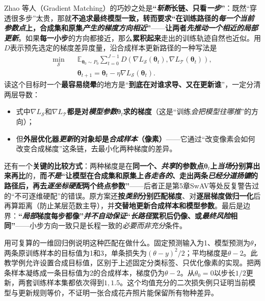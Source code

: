 Zhao 等人（Gradient Matching）的巧妙之处是\textbf{“\emph{斩断}长链、只看\emph{一步}”}：既然“穿透很多步”太贵，那就\textbf{不追求最终模型一致，转而要求“在训练路径的\emph{每一个当前参数点}上，合成集和原集\emph{产生的\emph{梯度方向}相近}”}——\textbf{让两者\emph{先推动一个\emph{相近的局部更新}}}。如果\textbf{每一小步}的方向都接近，那么\textbf{累积起来}走出的训练轨迹自然也近似。用$D$表示预先选定的梯度差异度量，沿合成样本更新路径的一种写法是
\begin{equation}
  \begin{aligned}
    \min_{\mathcal S}\quad&
    \mathbb E_{\bm\theta_0\sim P_0}
    \sum_{t=0}^{J-1}
    D\!\left(\nabla L_{\mathcal S}(\bm\theta_t),
             \nabla L_{\mathcal T}(\bm\theta_t)\right),\\
    &\bm\theta_{t+1}
    =\bm\theta_t-\eta\nabla L_{\mathcal S}(\bm\theta_t).
  \end{aligned}
  \label{eq:ka-condensation-gradient-matching}
\end{equation}
读这个目标时一个\textbf{最容易绕晕}的地方是“\textbf{到底在对谁求导、又在更新谁}”，一定分清两层导数：
\begin{itemize}\item 式中$\nabla L_{\mathcal{S}}$和$\nabla L_{\mathcal{T}}$\textbf{都是对\emph{模型参数}$\bm{\theta}_t$求的梯度}（这是“训练\emph{会把模型往哪推}”的方向）；\item 但\textbf{外层优化器\emph{更新}的对象却是\emph{合成样本}（像素）}——它通过“改变像素会如何改变合成梯度”这条链，去最小化两种梯度的差异。\end{itemize}
还有一个\textbf{关键的比较方式}：两种梯度是在\textbf{同一个、\emph{共享}的参数点}$\bm{\theta}_t$\textbf{上\emph{当场}分别算出来再比}的，\textbf{而\emph{不是}“让模型在合成集和原集上\emph{各走各的}、走出两条\emph{已经分道扬镳}的路径后，再去\emph{逐坐标硬配}两个终点参数”}——后者正是第5章SwAV等处反复警告过的“不可逐维硬配”的错误。原方案还\textbf{按\emph{类别}分别匹配梯度}、对\textbf{逐层梯度做归一化}后再算距离（防止某层范数主导），并\textbf{交替地更新合成样本和模型参数}。最后是边界：\textbf{“\emph{局部}梯度每步都像”\emph{并不自动保证}“\emph{长路径}累积后仍像、或\emph{最终风险}相同”}——小步方向一致只是长程一致的\emph{必要而非充分}条件。

用可复算的一维回归例说明这种匹配在做什么。固定预测输入为1、模型预测为$\theta$，两条原训练样本的目标值为1和3，单条损失为$(\theta-y)^2/2$；平均梯度是$\theta-2$。此教学例允许设置合成目标值，区别于上述固定分类标签、只优化像素的实现。把两条样本凝练成一条目标值为2的合成样本，梯度仍为$\theta-2$。从$\theta_0=0$以步长$1/2$更新，两套训练样本集都依次得到$1,1.5$。这个均值充分的二次损失例只证明当前模型与更新规则等价，不证明一张合成花卉照片能保留所有物种差异。

